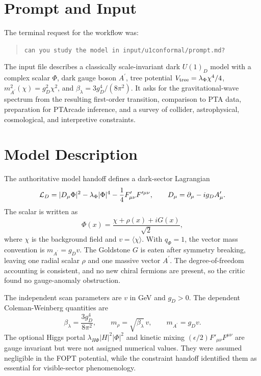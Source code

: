 \documentclass[11pt]{article}
\newcommand{\ap}{A^\prime}
\newcommand{\gD}{g_D}
\newcommand{\lamHP}{\lambda_{H\Phi}}
\newcommand{\eps}{\epsilon}
\begin{document}
\section{Prompt and Input}

The terminal request for the workflow was:
\begin{quote}
\texttt{can you study the model in input/u1conformal/prompt.md?}
\end{quote}
The input file describes a classically scale-invariant dark \(U(1)_D\) model with a complex scalar \(\Phi\), dark gauge boson \(\ap\), tree potential \(V_{\rm tree}=\lambda_\Phi \chi^4/4\), \(m_{\ap}^2(\chi)=\gD^2\chi^2\), and \(\beta_\lambda=3\gD^4/(8\pi^2)\). It asks for the gravitational-wave spectrum from the resulting first-order transition, comparison to PTA data, preparation for PTArcade inference, and a survey of collider, astrophysical, cosmological, and interpretive constraints.

\section{Model Description}

The authoritative model handoff defines a dark-sector Lagrangian
\begin{equation}
{\cal L}_D = |D_\mu \Phi|^2 - \lambda_\Phi |\Phi|^4 - \frac{1}{4}F'_{\mu\nu}F'^{\mu\nu},
\qquad
D_\mu=\partial_\mu-i\gD A'_\mu .
\end{equation}
The scalar is written as
\begin{equation}
\Phi(x)=\frac{\chi+\rho(x)+iG(x)}{\sqrt{2}},
\end{equation}
where \(\chi\) is the background field and \(v=\langle\chi\rangle\). With \(q_\Phi=1\), the vector mass convention is \(m_{\ap}= \gD v\). The Goldstone \(G\) is eaten after symmetry breaking, leaving one radial scalar \(\rho\) and one massive vector \(\ap\). The degree-of-freedom accounting is consistent, and no new chiral fermions are present, so the critic found no gauge-anomaly obstruction.

The independent scan parameters are \(v\) in GeV and \(\gD>0\). The dependent Coleman-Weinberg quantities are
\begin{equation}
\beta_\lambda = \frac{3\gD^4}{8\pi^2}, \qquad
m_\rho = \sqrt{\beta_\lambda}\,v, \qquad
m_{\ap}=\gD v .
\end{equation}
The optional Higgs portal \(\lamHP |H|^2|\Phi|^2\) and kinetic mixing \((\eps/2)F'_{\mu\nu}F^{\mu\nu}\) are gauge invariant but were not assigned numerical values. They were assumed negligible in the FOPT potential, while the constraint handoff identified them as essential for visible-sector phenomenology.
\end{document}

